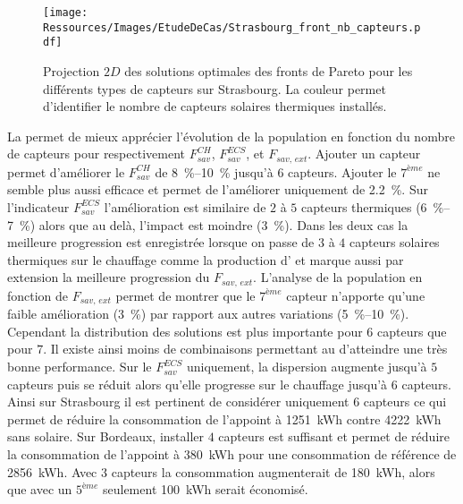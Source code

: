 \begin{figure}
    \centering
    \texttt{[image: Ressources/Images/EtudeDeCas/Strasbourg\_front\_nb\_capteurs.pdf]}
    \caption[Projection $2D$ des solutions optimales des fronts de Pareto pour les
             différents types de capteurs sur Strasbourg.]
             {Projection $2D$ des solutions optimales des fronts de Pareto pour les
              différents types de capteurs sur Strasbourg. La couleur permet d’identifier le nombre
              de capteurs solaires thermiques installés.}
    \label{fig:front_pareto_nb_th}
\end{figure}


La  permet de mieux apprécier l’évolution de la
population en fonction du nombre de capteurs pour respectivement $F_{sav}^{CH}$,
$F_{sav}^{ECS}$, et $F_{sav,\, ext}$. Ajouter un capteur permet d’améliorer le
$F_{sav}^{CH}$ de \SIrange{8}{10}{\percent} jusqu’à $6$ capteurs. Ajouter le $7^{ème}$ ne
semble plus aussi efficace et permet de l’améliorer uniquement de \SI{2.2}{\percent}. Sur
l’indicateur $F_{sav}^{ECS}$ l’amélioration est similaire de $2$ à $5$ capteurs thermiques
(\SIrange{6}{7}{\percent}) alors que au delà, l’impact est moindre (\SI{3}{\percent}).
Dans les deux cas la meilleure progression est enregistrée lorsque on passe de $3$ à $4$
capteurs solaires thermiques sur le chauffage comme la production d’ et marque
aussi par extension la meilleure progression du $F_{sav,\, ext}$. L’analyse de la
population en fonction de $F_{sav,\, ext}$ permet de montrer que le $7^{ème}$ capteur
n’apporte qu’une faible amélioration (\SI{3}{\percent}) par rapport aux autres variations
(\SIrange{5}{10}{\percent}). Cependant la distribution des solutions est plus importante
pour $6$ capteurs que pour $7$. Il existe ainsi moins de combinaisons permettant au
 d’atteindre une très bonne performance. Sur le $F_{sav}^{ECS}$ uniquement, la
dispersion augmente jusqu’à $5$ capteurs puis se réduit alors qu’elle progresse sur le
chauffage jusqu’à $6$ capteurs. Ainsi sur Strasbourg il est pertinent de considérer
uniquement $6$ capteurs ce qui permet de réduire la consommation de l’appoint à
\SI{1251}{kWh} contre \SI{4222}{kWh} sans solaire. Sur Bordeaux, installer $4$ capteurs
est suffisant et permet de réduire la consommation de l’appoint à \SI{380}{kWh} pour une
consommation de référence de \SI{2856}{kWh}. Avec $3$ capteurs la consommation
augmenterait de \SI{180}{kWh}, alors que avec un $5^{ème}$ seulement \SI{100}{kWh} serait
économisé.

